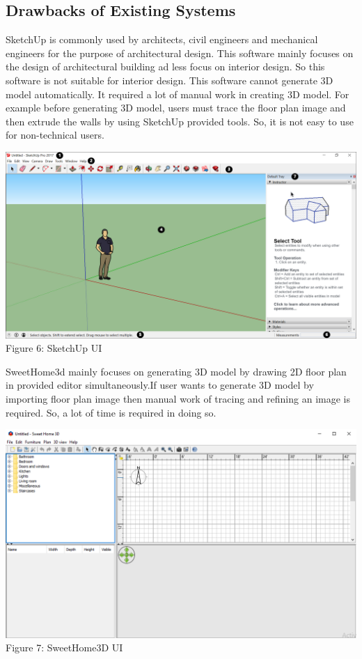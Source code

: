 \documentclass{article}
\begin{document}
\subsection{Drawbacks of Existing Systems}
SketchUp is commonly used by architects, civil engineers and mechanical engineers for the purpose of architectural design. This software mainly focuses on the design of architectural building ad less focus on interior design. So this software is not suitable for interior design. This software cannot generate 3D model automatically. It required a lot of manual work in creating 3D model. For example before generating 3D model, users must trace the floor plan image and then extrude the walls by using SketchUp provided tools. So, it is not easy to use for non-technical users.\cite{sketchup}\\
\begin{center}
\includegraphics[scale=0.23]{sketchUp}
\\Figure 6: SketchUp UI
\end{center}
SweetHome3d mainly focuses on generating 3D model by drawing 2D floor plan in provided editor simultaneously.If user wants to generate 3D model by importing floor plan image then manual work of tracing and refining an image is required. So, a lot of time is required in doing so.
\begin{center}
\includegraphics[scale=0.54]{sweetHome}
Figure 7: SweetHome3D UI
\end{center}
\end{document}
